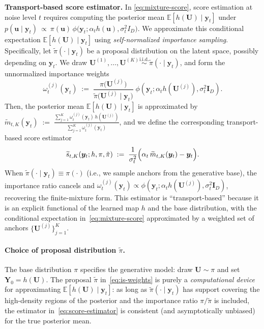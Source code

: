 \documentclass[12pt]{article}
\theoremstyle{definition} %
\newcommand{\U}{\bm U}
\newcommand{\Y}{\bm Y}
\newcommand{\y}{\bm y}
\begin{document}
\noindent\textbf{Transport-based score estimator.} In \eqref{eq:mixture-score},  score estimation at noise level 
$t$ requires computing the posterior mean $\mathbb E[h(\U)\mid \y_t]$ under
$p(\bm u\mid \y_t)\ \propto\ \pi(\bm u)\,\phi\bigl(\y_t;\alpha_t h(\bm u),\sigma_t^2 I_D\bigr)$.
We approximate this conditional expectation $\mathbb E[h(\U)\mid \y_t]$ using \emph{self-normalized importance sampling}. Specifically, let $\tilde\pi(\cdot\mid \y_t)$ be a proposal distribution on the latent space, possibly depending on $\y_t$. We draw
$\U^{(1)},\dots,\U^{(K)}\stackrel{\text{i.i.d.}}{\sim}\tilde\pi(\cdot\mid \y_t)$, and form the unnormalized importance weights
\begin{equation}
\label{eq:is-weights}
\omega_t^{(j)}(\y_t)
\;:=\;
\frac{\pi\bigl(\U^{(j)}\bigr)}{\tilde\pi\bigl(\U^{(j)}\mid \y_t\bigr)}
\;\phi\!\left(\y_t;\alpha_t h\!\left(\U^{(j)}\right),\sigma_t^2 \bm{I}_D\right).
\end{equation}
Then, the posterior mean $\mathbb E[h(\U)\mid \y_t]$ is approximated by
$\widetilde m_{t,K}(\y_t)
\;:=\;
\frac{\sum_{j=1}^K \omega_t^{(j)}(\y_t)\,h(\U^{(j)})}{\sum_{j=1}^K \omega_t^{(j)}(\y_t)}$,
and we define the corresponding transport-based score estimator
\begin{align}
\label{eq:score-estimator}
\widetilde s_{t,K}(\y_t;h,\pi,\tilde\pi)
\;:=\;
\frac{1}{\sigma_t^2}\Bigl(\alpha_t\,\widetilde m_{t,K}(\y_t)-\y_t\Bigr).
\end{align}
When $\tilde\pi(\cdot\mid \y_t)\equiv \pi(\cdot)$ (i.e., we sample anchors from the generative base), the importance ratio cancels and
$\omega_t^{(j)}(\y_t)\propto \phi\!\left(\y_t;\alpha_t h(\U^{(j)}),\sigma_t^2 \bm{I}_D\right)$, recovering the finite-mixture form.
This estimator is ``transport-based'' because it is an explicit functional of the learned map $h$ and the base distribution, with the conditional
expectation in~\eqref{eq:mixture-score} approximated by a weighted set of anchors $\{\U^{(j)}\}_{j=1}^K$.

\paragraph{Choice of proposal distribution $\tilde\pi$.}
The base distribution $\pi$ specifies the generative model: draw $\U \sim \pi$ and set $\Y_0 = h(\U)$. The proposal $\tilde\pi$ in~\eqref{eq:is-weights} is purely a \emph{computational device} for approximating $\mathbb E[h(\U)\mid \y_t]$:
as long as $\tilde\pi(\cdot\mid \y_t)$ has support covering the high-density regions of the posterior and the importance ratio
$\pi/\tilde\pi$ is included, the estimator in~\eqref{eq:score-estimator} is consistent (and asymptotically unbiased) for the true posterior mean.
\end{document}
